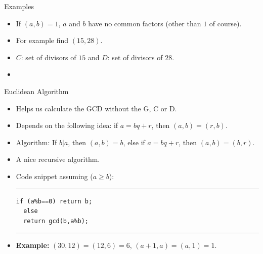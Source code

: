 \documentclass[ %
 usenames,dvipsnames,
aspectratio=169,11pt ]{beamer}
\newenvironment{stepitemize}{\begin{itemize}[<+->]}{\end{itemize} }
\begin{document}
\begin{frame}{Examples}
\begin{stepitemize}
\item If $(a,b)=1$, $a$ and $b$ have no common factors (other than $1$ of course).
\item For example find $(15,28)$.
\item $C$: set of divisors of $15$ and $D$: set of divisors of $28$.

\bigskip

\item[]
\begin{center}
\end{center}
\end{stepitemize}

\end{frame}
\begin{frame}[fragile]{Euclidean Algorithm}
\begin{stepitemize}
    \item Helps us calculate the GCD without the G, C or D.
    \item Depends on the following idea: if $a=bq+r$, then $(a,b)=(r,b)$.
    \item Algorithm: If $b|a$, then $(a,b)=b$, else if $a=bq+r$, then $(a,b)=(b,r)$.
    \item A nice recursive algorithm.
    \item Code snippet assuming ($a\geq b$): \\

     \rule{\textwidth}{1pt}
\begin{verbatim}
if (a%b==0) return b;
  else
  return gcd(b,a%b);
\end{verbatim}
\rule{\textwidth}{1pt}

\item {\bf Example:} $(30,12)=(12,6)=6$,\:\:\: $(a+1,a)=(a,1)=1$.
\end{stepitemize}
\end{frame}
\end{document}
